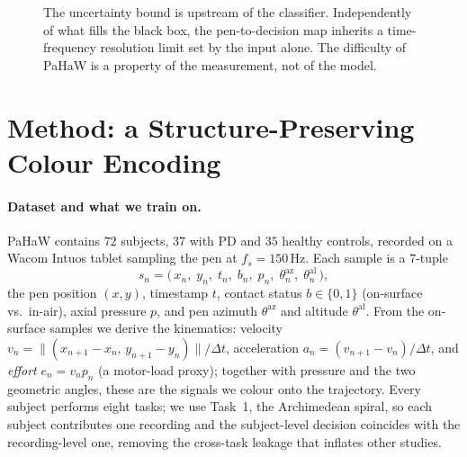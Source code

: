 \documentclass{article}
\begin{document}
\begin{figure}[t]
\centering
{}
\caption{The uncertainty bound is upstream of the classifier. Independently of what
fills the black box, the pen-to-decision map inherits a time-frequency resolution
limit set by the input alone. The difficulty of PaHaW is a property of the
measurement, not of the model.}
\label{fig:blackbox}
\end{figure}

\section{Method: a Structure-Preserving Colour Encoding}
\label{sec:method}

\paragraph{Dataset and what we train on.}
PaHaW \citep{drotar2016} contains $72$ subjects, $37$ with PD and $35$ healthy
controls, recorded on a Wacom Intuos tablet sampling the pen at $f_s=150$\,Hz. Each
sample is a $7$-tuple
\begin{equation}
s_n=\big(\,x_n,\;y_n,\;t_n,\;b_n,\;p_n,\;\theta^{\mathrm{az}}_n,\;\theta^{\mathrm{al}}_n\,\big),
\end{equation}
the pen position $(x,y)$, timestamp $t$, contact status $b\in\{0,1\}$ (on-surface vs.\
in-air), axial pressure $p$, and pen azimuth $\theta^{\mathrm{az}}$ and altitude
$\theta^{\mathrm{al}}$. From the on-surface samples we derive the kinematics: velocity
$v_n=\lVert(x_{n+1}{-}x_n,\,y_{n+1}{-}y_n)\rVert/\Delta t$, acceleration
$a_n=(v_{n+1}{-}v_n)/\Delta t$, and \emph{effort} $e_n=v_n p_n$ (a motor-load proxy);
together with pressure and the two geometric angles, these are the signals we colour
onto the trajectory. Every subject performs eight tasks; we use Task~1, the
Archimedean spiral, so each subject contributes one recording and the subject-level
decision coincides with the recording-level one, removing the cross-task leakage that
inflates other studies.
\end{document}
